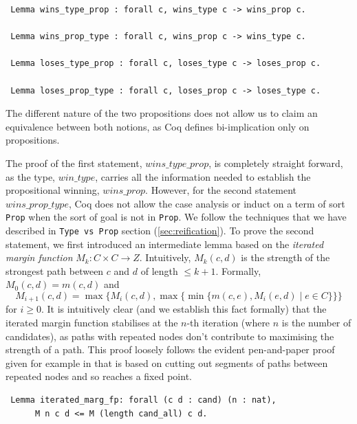 \begin{verbatim}
 Lemma wins_type_prop : forall c, wins_type c -> wins_prop c.

 Lemma wins_prop_type : forall c, wins_prop c -> wins_type c.
 
 Lemma loses_type_prop : forall c, loses_type c -> loses_prop c.
 
 Lemma loses_prop_type : forall c, loses_prop c -> loses_type c.
\end{verbatim}

\noindent
The different nature of the two propositions does not allow
us to claim an equivalence between both notions, as Coq defines
bi-implication only on propositions.

The proof of the first statement, $wins\_type\_prop$, is completely straight forward, as
the type, $win\_type$, carries all the information needed to establish the
propositional winning, $wins\_prop$. However, for the second statement 
$wins\_prop\_type$, Coq does not allow the 
case analysis or induct on a term of sort \texttt{Prop} when the sort of goal 
is not in \texttt{Prop}. We follow the techniques that we have described in 
\texttt{Type vs Prop} section (\ref{sec:reification}).
%
\noindent
To prove the second statement, we first introduced an 
intermediate lemma based on the \emph{iterated margin
function}
$M_k: C \times C \to Z$. Intuitively, $M_k (c, d)$ is the
strength of the strongest path between $c$ and $d$ of length $\leq
k+1$. Formally,
$M_0 (c, d) = m(c, d)$ and
\[ M_{i+1}(c, d) = \max \lbrace M_i(c, d), \max \lbrace  \min
\lbrace m(c, e), M_i(e, d) \mid e \in C \rbrace \rbrace \rbrace
\] for $i \geq 0$. 
It is intuitively clear (and we establish this fact formally) that
the iterated margin function stabilises at the $n$-th iteration
(where $n$ is the number of candidates), as paths with repeated
nodes don't contribute to maximising the strength of a path. This
proof loosely follows the evident pen-and-paper proof given for
example in
\citep{Carre:1971:ANR} that is based on cutting out segments of paths
between repeated nodes and so reaches a fixed point.

\begin{verbatim}
 Lemma iterated_marg_fp: forall (c d : cand) (n : nat),
      M n c d <= M (length cand_all) c d.
\end{verbatim}


